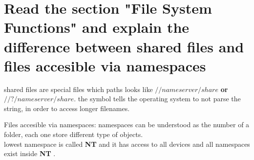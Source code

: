 \documentclass[10pt,a4paper]{article} %
\begin{document}
    \section{Read the section "File System Functions" and explain the
    difference between shared files and files accesible via namespaces}

    shared files are special files which paths looks like  \textbf{$ //nameserver/share  $}
    \textbf{or}   \textit{\textbf{\textbf{\textbf{$ //?/nameserver/share
    $}}}}. the symbol  tells the operating
    system to  not parse the string, in order to access longer
    filenames.

    Files accesible via namespaces:
    namespaces can be understood as the number of a folder, each one store
    different type of objects.
    \\
    lowest namespace is called \textbf{NT}  and it has access to all devices
    and  all namespaces exist inside \textbf{NT} .

























    \nocite{*}
    
    
\end{document}
